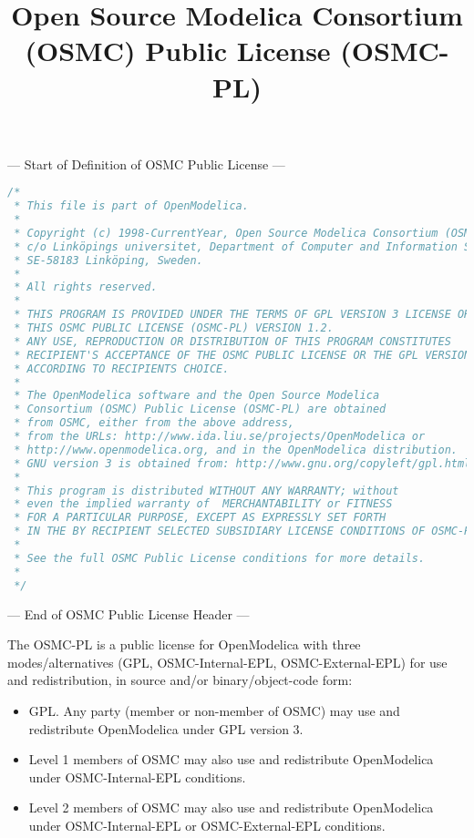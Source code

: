 \documentclass[a4paper, 12pt]{article}
\begin{document}
\title{Open Source Modelica Consortium (OSMC) Public License (OSMC-PL)}
\date{}

\maketitle
--- Start of Definition of OSMC Public License ---

\begin{lstlisting}[language=c++,
  breakatwhitespace=true,
  breaklines=true]
/*
 * This file is part of OpenModelica.
 *
 * Copyright (c) 1998-CurrentYear, Open Source Modelica Consortium (OSMC),
 * c/o Linköpings universitet, Department of Computer and Information Science,
 * SE-58183 Linköping, Sweden.
 *
 * All rights reserved.
 *
 * THIS PROGRAM IS PROVIDED UNDER THE TERMS OF GPL VERSION 3 LICENSE OR
 * THIS OSMC PUBLIC LICENSE (OSMC-PL) VERSION 1.2.
 * ANY USE, REPRODUCTION OR DISTRIBUTION OF THIS PROGRAM CONSTITUTES
 * RECIPIENT'S ACCEPTANCE OF THE OSMC PUBLIC LICENSE OR THE GPL VERSION 3,
 * ACCORDING TO RECIPIENTS CHOICE.
 *
 * The OpenModelica software and the Open Source Modelica
 * Consortium (OSMC) Public License (OSMC-PL) are obtained
 * from OSMC, either from the above address,
 * from the URLs: http://www.ida.liu.se/projects/OpenModelica or
 * http://www.openmodelica.org, and in the OpenModelica distribution.
 * GNU version 3 is obtained from: http://www.gnu.org/copyleft/gpl.html.
 *
 * This program is distributed WITHOUT ANY WARRANTY; without
 * even the implied warranty of  MERCHANTABILITY or FITNESS
 * FOR A PARTICULAR PURPOSE, EXCEPT AS EXPRESSLY SET FORTH
 * IN THE BY RECIPIENT SELECTED SUBSIDIARY LICENSE CONDITIONS OF OSMC-PL.
 *
 * See the full OSMC Public License conditions for more details.
 *
 */
\end{lstlisting}

--- End of OSMC Public License Header ---

\vspace{1cm}

The OSMC-PL is a public license for OpenModelica with three modes/alternatives (GPL, OSMC-Internal-EPL, OSMC-External-EPL) for use and redistribution, in source and/or binary/object-code form:
\begin{itemize}
\item GPL. Any party (member or non-member of OSMC) may use and redistribute
 OpenModelica under GPL version 3.
\item Level 1 members of OSMC may also use and redistribute OpenModelica under
 OSMC-Internal-EPL conditions.
\item Level 2 members of OSMC may also use and redistribute OpenModelica under
 OSMC-Internal-EPL or OSMC-External-EPL conditions.
\end{itemize}
\end{document}
